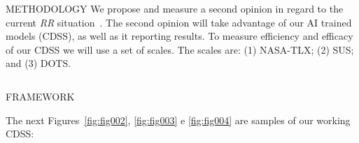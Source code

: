 \documentclass[final]{beamer}
\begin{document}
\begin{frame}[t, fragile = singleslide]{}
\begin{columns}[t]
\begin{column}{0.45\textwidth}
\begin{block}{METHODOLOGY}
We propose and measure a second opinion in regard to the current \textit{RR} situation~\cite{calisto2019aiutgcbmmaias}.
The second opinion will take advantage of our AI trained models (CDSS), as well as it reporting results.
To measure efficiency and efficacy of our CDSS we will use a set of scales. The scales are: (1) NASA-TLX; (2) SUS; and (3) DOTS.

\vspace{10mm}

\end{block}

\end{column}

\end{columns}

\begin{columns}[t]

\begin{column}{0.945\textwidth}

\begin{block}{FRAMEWORK}

The next Figures~\ref{fig:fig002}, \ref{fig:fig003} e \ref{fig:fig004} are samples of our working CDSS:


\end{block}
\end{column}
\end{columns}
\end{frame}
\end{document}
